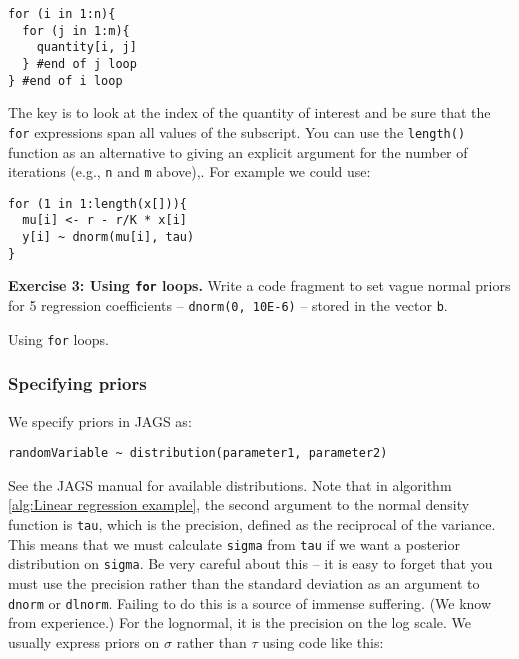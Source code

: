 \documentclass[12pt,english]{article}
\begin{document}
\begin{Verbatim}
for (i in 1:n){
  for (j in 1:m){
    quantity[i, j]
  } #end of j loop
} #end of i loop
\end{Verbatim}

\noindent The key is to look at the index of the quantity of interest and be sure that the \texttt{for} expressions span all values of the subscript.  You can use the \texttt{length() } function as an alternative to giving an explicit argument for the number of iterations (e.g., \texttt{n} and \texttt{m} above),. For example we could use:

\begin{Verbatim}
for (1 in 1:length(x[])){
  mu[i] <- r - r/K * x[i]
  y[i] ~ dnorm(mu[i], tau)
}
\end{Verbatim}

\belowcaptionskip=-40pt
\begin{exercise}
\begin{mdframed}
\doublespacing
\textbf{Exercise 3: Using \texttt{for} loops.} Write a code fragment to set vague normal priors for 5 regression coefficients -- \texttt{dnorm(0, 10E-6)} -- stored in the vector \texttt{b}. 
\end{mdframed}
\captionsetup{textformat=empty, labelformat=empty}
\caption[Using \texttt{for} loops]{Using \texttt{for} loops.}
\label{ex:forloops}
\end{exercise}
\belowcaptionskip=0pt

\subsubsection{Specifying priors}

We specify priors in JAGS as:

\begin{Verbatim}
randomVariable ~ distribution(parameter1, parameter2)
\end{Verbatim}

\noindent See the JAGS manual for available distributions. Note that in algorithm \ref{alg:Linear regression example}, the second argument to the normal density function is \texttt{tau}, which is the precision, defined as the reciprocal of the variance. This means that we must calculate \texttt{sigma} from \texttt{tau} if we want a posterior distribution on \texttt{sigma}. Be very careful about this -- it is easy to forget that you must use the precision rather than the standard deviation as an argument to \texttt{dnorm} or \texttt{dlnorm}. Failing to do this is a source of immense suffering. (We know from experience.) For the lognormal, it is the precision on the log scale. We usually express priors on $\sigma$ rather than $\tau$ using code like this:
\end{document}
